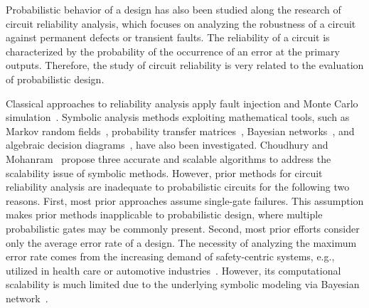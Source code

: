 Probabilistic behavior of a design has also been studied along the research of circuit reliability analysis,
which focuses on analyzing the robustness of a circuit against permanent defects or transient faults.
The reliability of a circuit is characterized by the probability of the occurrence of an error at the primary outputs.
Therefore, the study of circuit reliability is very related to the evaluation of probabilistic design.

Classical approaches to reliability analysis apply fault injection and Monte Carlo simulation~\cite{Mohanram2003}.
Symbolic analysis methods exploiting mathematical tools,
such as Markov random fields~\cite{Bahar2003},
probability transfer matrices~\cite{Krishnaswamy2005},
Bayesian networks~\cite{Rejimon2005},
and algebraic decision diagrams~\cite{Miskov-Zivanov2006},
have also been investigated.
Choudhury and Mohanram~\cite{Choudhury2009} propose three accurate and scalable algorithms to address the scalability issue of symbolic methods.
However, prior methods for circuit reliability analysis are inadequate to probabilistic circuits
for the following two reasons.
First, most prior approaches assume single-gate failures.
This assumption makes prior methods inapplicable to probabilistic design,
where multiple probabilistic gates may be commonly present.
Second, most prior efforts consider only the average error rate of a design.
The necessity of analyzing the maximum error rate comes from the increasing demand of safety-centric systems,
e.g., utilized in health care or automotive industries~\cite{Lingasubramanian2007,Lingasubramanian2011}.
However, its computational scalability is much limited due to the underlying symbolic modeling via Bayesian network~\cite{Jensen1996}.